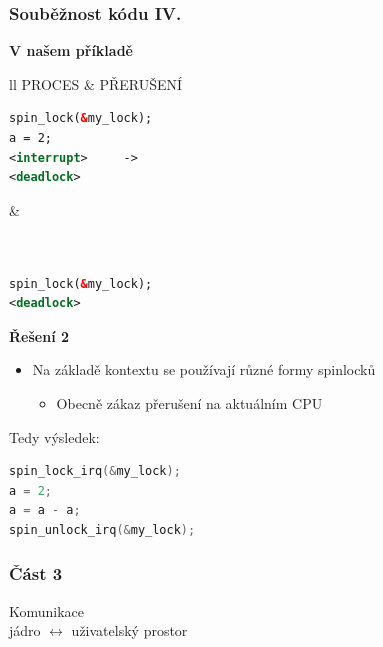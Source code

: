 \documentclass[xcolor=dvipsnames]{beamer}
\newcommand{\heading}[1]{\textbf{\textcolor{BurntOrange}{#1}}}
\begin{document}
\begin{frame}[fragile]
  \frametitle{Souběžnost kódu IV.}
  \heading{V našem příkladě}
  \begin{center}
  \begin{tabular}{ll}
PROCES & PŘERUŠENÍ \\ \hline
  \begin{lstlisting}[language=XML]
spin_lock(&my_lock);
a = 2;
<interrupt>     ->
<deadlock>
  \end{lstlisting} &
  \begin{lstlisting}[language=XML]


spin_lock(&my_lock);
<deadlock>
  \end{lstlisting}
  \end{tabular}
  \end{center}

  \pause

  \heading{Řešení 2}
  \begin{itemize}
  \item Na základě kontextu se používají různé formy spinlocků
  \begin{itemize}
  \item Obecně zákaz přerušení na aktuálním CPU
  \end{itemize}
  \end{itemize}

  \pause
  \medskip

  Tedy výsledek:
  \begin{lstlisting}[language=C]
spin_lock_irq(&my_lock);
a = 2;
a = a - a;
spin_unlock_irq(&my_lock);
  \end{lstlisting}

\end{frame}

\begin{frame}
  \frametitle{Část 3}
  \begin{center}
  {\huge Komunikace \\[0.8em] jádro $\leftrightarrow$ uživatelský prostor}
  \end{center}
\end{frame}
\end{document}

